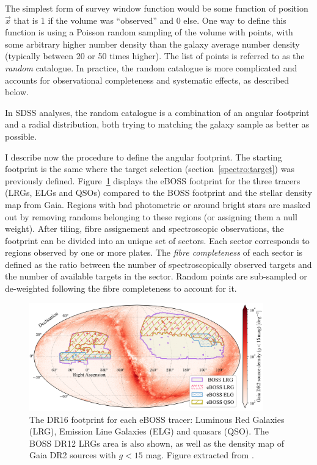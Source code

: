 The simplest form of survey window function would be some function of position $\vec{x}$ 
that is 1 if the volume was ``observed'' and 0 else. 
One way to define this function is using a Poisson random sampling 
of the volume with points, with some arbitrary higher number density than the 
galaxy average number density (typically between 20 or 50 times higher). 
The list of points is referred to as the \emph{random} catalogue. 
In practice, the random catalogue is more complicated and accounts for 
observational completeness and systematic effects, as described below. 

In SDSS analyses, the random catalogue is a combination of an angular footprint 
and a radial distribution, both trying to matching the galaxy sample as better as possible. 

I describe now the procedure to define the angular footprint. 
The starting footprint is the same where the target selection 
(section~\ref{spectro:target})
was previously defined. 
Figure~\ref{fig:eboss_footprint} displays the eBOSS footprint for the three tracers 
(LRGs, ELGs and QSOs) compared to the BOSS footprint and the stellar density map from Gaia. 
Regions with bad photometric or around 
bright stars are masked out by removing randoms belonging to these regions
(or assigning them a null weight). 
After tiling, fibre assignement and spectroscopic observations, the footprint 
can be divided into an unique set of sectors. Each sector corresponds to regions
observed by one or more plates. The \emph{fibre completeness} of each sector is 
defined as the ratio between the number of spectroscopically observed targets and 
the number of available targets in the sector. Random points are sub-sampled or de-weighted 
following the fibre completeness to account for it. 

\begin{figure}
    \centering 
    \includegraphics[width=0.9\textwidth]{fig/galaxies/eboss_footprint.png}
    \caption{ The DR16 footprint for each eBOSS tracer: Luminous Red Galaxies (LRG), 
    Emission Line Galaxies (ELG) and quasars (QSO). The BOSS DR12 LRGs area is also shown, 
    as well as the density map of Gaia DR2 sources with $g < 15$ mag.
    Figure extracted from \cite{zhaoCompletedSDSSIVExtended2021}.} 
    \label{fig:eboss_footprint}
\end{figure}

